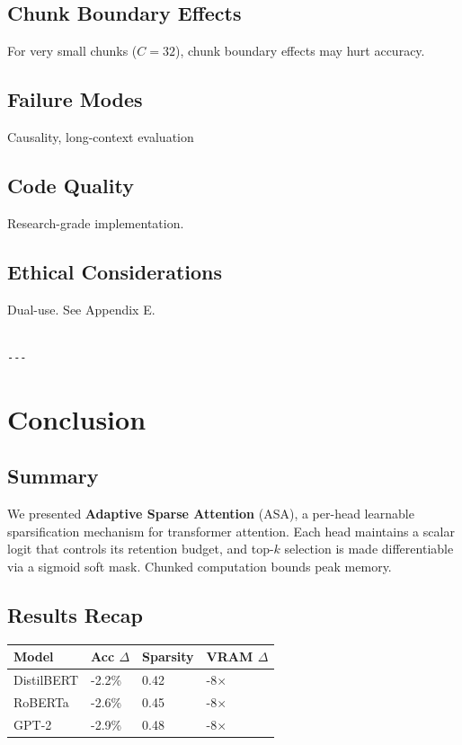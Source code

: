 \subsection{Chunk Boundary Effects}

For very small chunks ($C = 32$), chunk boundary effects may hurt accuracy.

\subsection{Failure Modes}

Causality, long-context evaluation

\subsection{Code Quality}

Research-grade implementation.

\subsection{Ethical Considerations}

Dual-use. See Appendix E.
\begin{lstlisting}

---
\end{lstlisting}


\section{Conclusion}

\subsection{Summary}

We presented \textbf{Adaptive Sparse Attention} (ASA), a per-head learnable 
sparsification mechanism for transformer attention. Each head maintains a 
scalar logit that controls its retention budget, and top-$k$ selection is 
made differentiable via a sigmoid soft mask. Chunked computation bounds 
peak memory.

\subsection{Results Recap}

\begin{table}[H]
\centering
\small
\begin{tabular}{llll}
\toprule
\textbf{Model} & \textbf{Acc $\Delta$} & \textbf{Sparsity} & \textbf{VRAM $\Delta$} \\
\midrule
DistilBERT & -2.2\% & 0.42 & -8$\times$ \\
RoBERTa & -2.6\% & 0.45 & -8$\times$ \\
GPT-2 & -2.9\% & 0.48 & -8$\times$ \\
\bottomrule
\end{tabular}
\end{table}

